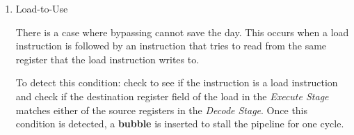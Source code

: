 \documentclass[12pt]{article}
\newenvironment{QandA}{\begin{enumerate}[label=\bfseries\arabic*.]\bfseries}
                      {\end{enumerate}}
\newenvironment{answered}{\par\quad\normalfont}{}
\begin{document}
\begin{QandA}
   \
   
   \item Load-to-Use 
   \begin{answered}
   There is a case where bypassing cannot save the day. This occurs when a load instruction is followed by an instruction that tries to read from the same register that the load instruction writes to.
   
   To detect this condition: check to see if the instruction is a load instruction and check if the destination register field of the load in the \textit{Execute Stage} matches either of the source registers in the \textit{Decode Stage}. Once this condition is detected, a \textbf{bubble} is inserted to stall the pipeline for one cycle. 
   \end{answered}
   
   
\end{QandA}
\end{document}
